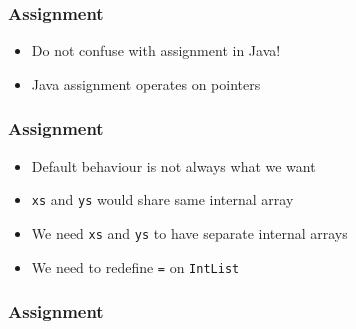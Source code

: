 \begin{frame}
  \frametitle{Assignment}
  \begin{itemize}
    \item Do not confuse with assignment in Java!
    \item Java assignment operates on pointers
  \end{itemize}
\end{frame}

\begin{frame}
  \frametitle{Assignment}
  \begin{itemize}
    \item Default behaviour is not always what we want
    \item \texttt{xs} and \texttt{ys} would share same internal array
    \item We need \texttt{xs} and \texttt{ys} to have separate internal arrays
    \item We need to redefine \texttt{=} on \texttt{IntList}
  \end{itemize}
\end{frame}

\begin{frame}
  \frametitle{Assignment}
\end{frame}

